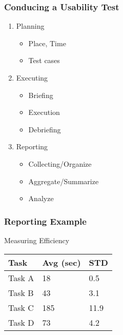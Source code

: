 \begin{frame}
    \frametitle{Conducing a Usability Test}
    \begin{enumerate}
        \item Planning
            \begin{itemize}
                \item Place, Time
                \item Test cases
            \end{itemize}
        \item Executing
            \begin{itemize}
                \item Briefing
                \item Execution
                \item Debriefing
            \end{itemize}
        \item Reporting
            \begin{itemize}
                \item Collecting/Organize
                \item Aggregate/Summarize
                \item Analyze
            \end{itemize}
    \end{enumerate}
\end{frame}

\begin{frame}
    \frametitle{Reporting Example}
    \begin{block}{Measuring Efficiency}
        \centering
        \begin{tabular}{ l l l }
            \textbf{Task} & \textbf{Avg (sec)} & \textbf{STD} \\ \hline
            Task A & 18 & 0.5 \\
            Task B & 43 & 3.1 \\
            \rowcolor{yellow}
            Task C & 185 & 11.9 \\
            Task D & 73 & 4.2 \\
        \end{tabular}
    \end{block}
\end{frame}


